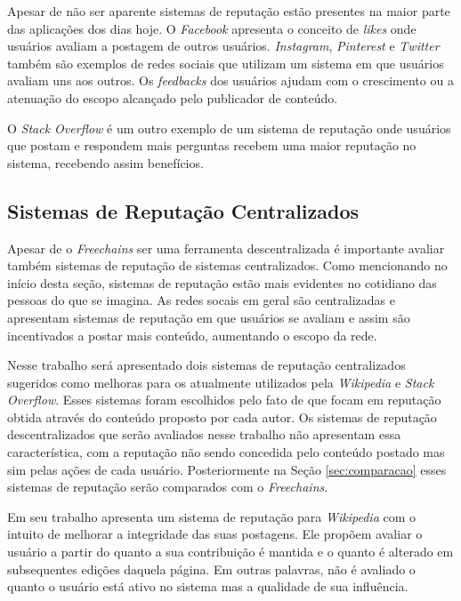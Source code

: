 \documentclass[12pt]{article}
\newcommand{\FC} {\emph{Freechains}\xspace}
\begin{document}
Apesar de não ser aparente sistemas de reputação estão presentes na maior parte das aplicações dos dias hoje. O \emph{Facebook} apresenta o conceito de \emph{likes} onde usuários avaliam a postagem de outros usuários. \emph{Instagram}, \emph{Pinterest} e \emph{Twitter} também são exemplos de redes sociais que utilizam um sistema em que usuários avaliam uns aos outros. Os \emph{feedbacks} dos usuários ajudam com o crescimento ou a atenuação do escopo alcançado pelo publicador de conteúdo.  

O \emph{Stack Overflow} é um outro exemplo de um sistema de reputação onde usuários que postam e respondem mais perguntas recebem uma maior reputação no sistema, recebendo assim benefícios.

\subsection{Sistemas de Reputação Centralizados} \label{subsec:SRCentra}

Apesar de o \FC ser uma ferramenta descentralizada é importante avaliar também sistemas de reputação de sistemas centralizados. Como mencionando no início desta seção, sistemas de reputação estão mais evidentes no cotidiano das pessoas do que se imagina. As redes socais em geral são centralizadas e apresentam sistemas de reputação em que usuários se avaliam e assim são incentivados a postar mais conteúdo, aumentando o escopo da rede.

Nesse trabalho será apresentado dois sistemas de reputação centralizados sugeridos como melhoras para os atualmente utilizados pela \emph{Wikipedia} e \emph{Stack Overflow}. Esses sistemas foram escolhidos pelo fato de que focam em reputação obtida através do conteúdo proposto por cada autor. Os sistemas de reputação descentralizados que serão avaliados nesse trabalho não apresentam essa característica, com a reputação não sendo concedida pelo conteúdo postado mas sim pelas ações de cada usuário. Posteriormente na Seção \ref{sec:comparacao} esses sistemas de reputação serão comparados com o \FC. 

Em seu trabalho \cite{adler2007content} apresenta um sistema de reputação para \emph{Wikipedia} com o intuito de melhorar a integridade das suas postagens. Ele propõem avaliar o usuário a partir do quanto a sua contribuição é mantida e o quanto é alterado em subsequentes edições daquela página. Em outras palavras, não é avaliado o quanto o usuário está ativo no sistema mas a qualidade de sua influência. 
\end{document}
